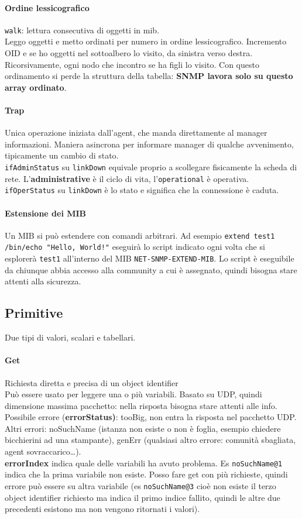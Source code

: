 \documentclass[10pt]{book}
\begin{document}
\paragraph{Ordine lessicografico} \texttt{walk}: lettura consecutiva di oggetti in mib.\\
Leggo oggetti e metto ordinati per numero in ordine lessicografico. Incremento OID e se ho oggetti nel sottoalbero lo visito, da sinistra verso destra. Ricorsivamente, ogni nodo che incontro se ha figli lo visito. Con questo ordinamento si perde la struttura della tabella: \textbf{SNMP lavora solo su questo array ordinato}.
\paragraph{Trap} Unica operazione iniziata dall'agent, che manda direttamente al manager informazioni. Maniera asincrona per informare manager di qualche avvenimento, tipicamente un cambio di stato.\\
\texttt{ifAdminStatus} su \texttt{linkDown} equivale proprio a scollegare fisicamente la scheda di rete. L'\textbf{administrative} è il ciclo di vita, l'\texttt{operational} è operativa. \texttt{ifOperStatus} su \texttt{linkDown} è lo stato e significa che la connessione è caduta.
\paragraph{Estensione dei MIB} Un MIB si può estendere con comandi arbitrari. Ad esempio \texttt{extend test1 /bin/echo "Hello, World!"} eseguirà lo script indicato ogni volta che si esplorerà \texttt{test1} all'interno del MIB \texttt{NET-SNMP-EXTEND-MIB}. Lo script è eseguibile da chiunque abbia accesso alla community a cui è assegnato, quindi bisogna stare attenti alla sicurezza.
\subsection{Primitive}
Due tipi di valori, scalari e tabellari.
\paragraph{Get} Richiesta diretta e precisa di un object identifier\\
Può essere usato per leggere una o più variabili. Basato su UDP, quindi dimensione massima pacchetto: nella risposta bisogna stare attenti alle info. Possibile errore (\textbf{errorStatus)}: tooBig, non entra la risposta nel pacchetto UDP. Altri errori: noSuchName (istanza non esiste o non è foglia, esempio chiedere bicchierini ad una stampante), genErr (qualsiasi altro errore: comunità sbagliata, agent sovraccarico\ldots).\\
\textbf{errorIndex} indica quale delle variabili ha avuto problema. Es \texttt{noSuchName@1} indica che la prima variabile non esiste. Posso fare get con più richieste, quindi errore può essere su altra variabile (es \texttt{noSuchName@3} cioè non esiste il terzo object identifier richiesto ma indica il primo indice fallito, quindi le altre due precedenti esistono ma non vengono ritornati i valori).
\end{document}
